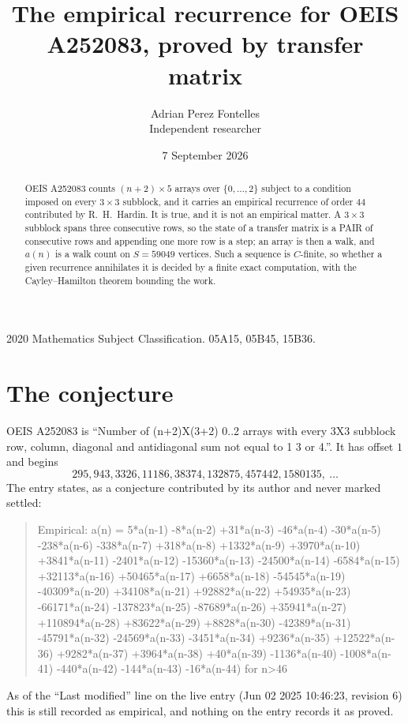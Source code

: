\documentclass[11pt,a4paper]{article}
\title{The empirical recurrence for OEIS A252083, proved by transfer matrix}
\author{Adrian Perez Fontelles\\ \small Independent researcher}
\date{7 September 2026}
\theoremstyle{plain}
\theoremstyle{definition}
\begin{document}
\maketitle

\begin{abstract}
OEIS A252083 counts $(n+2)\times5$ arrays over $\{0,\dots,2\}$ subject to a condition imposed on
every $3\times3$ subblock, and it carries an empirical recurrence of order $44$
contributed by R.~H.~Hardin. It is true, and it is not an empirical matter. A $3\times3$
subblock spans three consecutive rows, so the state of a transfer matrix is a PAIR of
consecutive rows and appending one more row is a step; an array is then a walk, and
$a(n)$ is a walk count on $S=59049$ vertices. Such a sequence is $C$-finite, so whether a given
recurrence annihilates it is decided by a finite exact computation, with the Cayley--Hamilton
theorem bounding the work.
\end{abstract}

\noindent\small 2020 Mathematics Subject Classification. 05A15, 05B45, 15B36.\normalsize

\section{The conjecture}

OEIS A252083 is ``Number of (n+2)X(3+2) 0..2 arrays with every 3X3 subblock row, column, diagonal and antidiagonal sum not equal to 1 3 or 4.''. It has offset $1$ and begins
\[
295, 943, 3326, 11186, 38374, 132875, 457442, 1580135,\ \dots
\]
The entry states, as a conjecture contributed by its author and never marked settled:
\begin{quote}
Empirical: a(n) = 5*a(n-1) -8*a(n-2) +31*a(n-3) -46*a(n-4) -30*a(n-5) -238*a(n-6) -338*a(n-7) +318*a(n-8) +1332*a(n-9) +3970*a(n-10) +3841*a(n-11) -2401*a(n-12) -15360*a(n-13) -24500*a(n-14) -6584*a(n-15) +32113*a(n-16) +50465*a(n-17) +6658*a(n-18) -54545*a(n-19) -40309*a(n-20) +34108*a(n-21) +92882*a(n-22) +54935*a(n-23) -66171*a(n-24) -137823*a(n-25) -87689*a(n-26) +35941*a(n-27) +110894*a(n-28) +83622*a(n-29) +8828*a(n-30) -42389*a(n-31) -45791*a(n-32) -24569*a(n-33) -3451*a(n-34) +9236*a(n-35) +12522*a(n-36) +9282*a(n-37) +3964*a(n-38) +40*a(n-39) -1136*a(n-40) -1008*a(n-41) -440*a(n-42) -144*a(n-43) -16*a(n-44) for n>46
\end{quote}
As of the ``Last modified'' line on the live entry (Jun 02 2025 10:46:23, revision 6) this is still
recorded as empirical, and nothing on the entry records it as proved.
\end{document}
